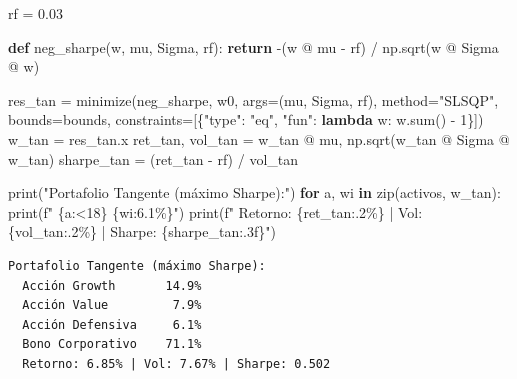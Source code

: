 \documentclass[
  spanish,
  letterpaper,
  DIV=11,
  numbers=noendperiod]{scrreprt}
\newenvironment{Shaded}{\begin{snugshade}}{\end{snugshade}}
\newcommand{\BuiltInTok}[1]{\textcolor[rgb]{0.00,0.23,0.31}{#1}}
\newcommand{\ControlFlowTok}[1]{\textcolor[rgb]{0.00,0.23,0.31}{\textbf{#1}}}
\newcommand{\DecValTok}[1]{\textcolor[rgb]{0.68,0.00,0.00}{#1}}
\newcommand{\FloatTok}[1]{\textcolor[rgb]{0.68,0.00,0.00}{#1}}
\newcommand{\KeywordTok}[1]{\textcolor[rgb]{0.00,0.23,0.31}{\textbf{#1}}}
\newcommand{\NormalTok}[1]{\textcolor[rgb]{0.00,0.23,0.31}{#1}}
\newcommand{\OperatorTok}[1]{\textcolor[rgb]{0.37,0.37,0.37}{#1}}
\newcommand{\SpecialCharTok}[1]{\textcolor[rgb]{0.37,0.37,0.37}{#1}}
\newcommand{\SpecialStringTok}[1]{\textcolor[rgb]{0.13,0.47,0.30}{#1}}
\newcommand{\StringTok}[1]{\textcolor[rgb]{0.13,0.47,0.30}{#1}}
\begin{document}
\label{tangente}
\begin{Shaded}
\begin{Highlighting}[]
\NormalTok{rf }\OperatorTok{=} \FloatTok{0.03}

\KeywordTok{def}\NormalTok{ neg\_sharpe(w, mu, Sigma, rf):}
    \ControlFlowTok{return} \OperatorTok{{-}}\NormalTok{(w }\OperatorTok{@}\NormalTok{ mu }\OperatorTok{{-}}\NormalTok{ rf) }\OperatorTok{/}\NormalTok{ np.sqrt(w }\OperatorTok{@}\NormalTok{ Sigma }\OperatorTok{@}\NormalTok{ w)}

\NormalTok{res\_tan }\OperatorTok{=}\NormalTok{ minimize(neg\_sharpe, w0, args}\OperatorTok{=}\NormalTok{(mu, Sigma, rf),}
\NormalTok{                   method}\OperatorTok{=}\StringTok{"SLSQP"}\NormalTok{, bounds}\OperatorTok{=}\NormalTok{bounds,}
\NormalTok{                   constraints}\OperatorTok{=}\NormalTok{[\{}\StringTok{"type"}\NormalTok{: }\StringTok{"eq"}\NormalTok{, }\StringTok{"fun"}\NormalTok{: }\KeywordTok{lambda}\NormalTok{ w: w.}\BuiltInTok{sum}\NormalTok{() }\OperatorTok{{-}} \DecValTok{1}\NormalTok{\}])}
\NormalTok{w\_tan }\OperatorTok{=}\NormalTok{ res\_tan.x}
\NormalTok{ret\_tan, vol\_tan }\OperatorTok{=}\NormalTok{ w\_tan }\OperatorTok{@}\NormalTok{ mu, np.sqrt(w\_tan }\OperatorTok{@}\NormalTok{ Sigma }\OperatorTok{@}\NormalTok{ w\_tan)}
\NormalTok{sharpe\_tan }\OperatorTok{=}\NormalTok{ (ret\_tan }\OperatorTok{{-}}\NormalTok{ rf) }\OperatorTok{/}\NormalTok{ vol\_tan}

\BuiltInTok{print}\NormalTok{(}\StringTok{"Portafolio Tangente (máximo Sharpe):"}\NormalTok{)}
\ControlFlowTok{for}\NormalTok{ a, wi }\KeywordTok{in} \BuiltInTok{zip}\NormalTok{(activos, w\_tan):}
    \BuiltInTok{print}\NormalTok{(}\SpecialStringTok{f"  }\SpecialCharTok{\{}\NormalTok{a}\SpecialCharTok{:\textless{}18\}}\SpecialStringTok{ }\SpecialCharTok{\{}\NormalTok{wi}\SpecialCharTok{:6.1\%\}}\SpecialStringTok{"}\NormalTok{)}
\BuiltInTok{print}\NormalTok{(}\SpecialStringTok{f"  Retorno: }\SpecialCharTok{\{}\NormalTok{ret\_tan}\SpecialCharTok{:.2\%\}}\SpecialStringTok{ | Vol: }\SpecialCharTok{\{}\NormalTok{vol\_tan}\SpecialCharTok{:.2\%\}}\SpecialStringTok{ | Sharpe: }\SpecialCharTok{\{}\NormalTok{sharpe\_tan}\SpecialCharTok{:.3f\}}\SpecialStringTok{"}\NormalTok{)}
\end{Highlighting}
\end{Shaded}

\begin{verbatim}
Portafolio Tangente (máximo Sharpe):
  Acción Growth       14.9%
  Acción Value         7.9%
  Acción Defensiva     6.1%
  Bono Corporativo    71.1%
  Retorno: 6.85% | Vol: 7.67% | Sharpe: 0.502
\end{verbatim}
\end{document}
